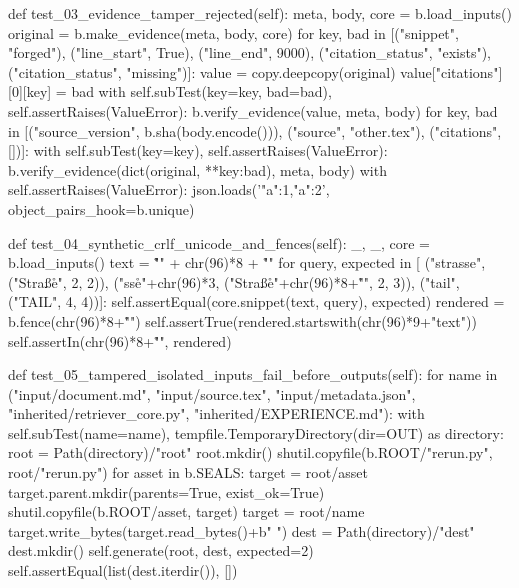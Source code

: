     def test_03_evidence_tamper_rejected(self):
        meta, body, core = b.load_inputs()
        original = b.make_evidence(meta, body, core)
        for key, bad in [("snippet", "forged\n"), ("line_start", True), ("line_end", 9000),
                         ("citation_status", "exists"), ("citation_status", "missing")]:
            value = copy.deepcopy(original)
            value["citations"][0][key] = bad
            with self.subTest(key=key, bad=bad), self.assertRaises(ValueError):
                b.verify_evidence(value, meta, body)
        for key, bad in [("source_version", b.sha(body.encode())), ("source", "other.tex"),
                         ("citations", [])]:
            with self.subTest(key=key), self.assertRaises(ValueError):
                b.verify_evidence(dict(original, **{key:bad}), meta, body)
        with self.assertRaises(ValueError):
            json.loads('{"a":1,"a":2}', object_pairs_hook=b.unique)

    def test_04_synthetic_crlf_unicode_and_fences(self):
        _, _, core = b.load_inputs()
        text = "\r{}\r\n" + chr(96)*8 + "\r\nTAIL"
        for query, expected in [
            ("strasse", ("Straße\r\n", 2, 2)),
            ("sse\r\n"+chr(96)*3, ("Straße\r\n"+chr(96)*8+"\r\n", 2, 3)),
            ("tail", ("TAIL", 4, 4))]:
            self.assertEqual(core.snippet(text, query), expected)
        rendered = b.fence(chr(96)*8+"\r\nTAIL")
        self.assertTrue(rendered.startswith(chr(96)*9+"text\n"))
        self.assertIn(chr(96)*8+"\r\nTAIL\n", rendered)

    def test_05_tampered_isolated_inputs_fail_before_outputs(self):
        for name in ("input/document.md", "input/source.tex", "input/metadata.json",
                     "inherited/retriever_core.py", "inherited/EXPERIENCE.md"):
            with self.subTest(name=name), tempfile.TemporaryDirectory(dir=OUT) as directory:
                root = Path(directory)/"root"
                root.mkdir()
                shutil.copyfile(b.ROOT/"rerun.py", root/"rerun.py")
                for asset in b.SEALS:
                    target = root/asset
                    target.parent.mkdir(parents=True, exist_ok=True)
                    shutil.copyfile(b.ROOT/asset, target)
                target = root/name
                target.write_bytes(target.read_bytes()+b" ")
                dest = Path(directory)/"dest"
                dest.mkdir()
                self.generate(root, dest, expected=2)
                self.assertEqual(list(dest.iterdir()), [])

